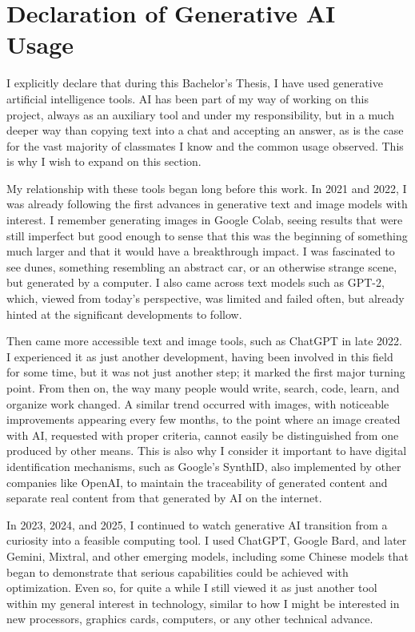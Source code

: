 \clearpage
{}
\section*{Declaration of Generative AI Usage}

I explicitly declare that during this Bachelor's Thesis, I have used generative artificial intelligence tools. AI has been part of my way of working on this project, always as an auxiliary tool and under my responsibility, but in a much deeper way than copying text into a chat and accepting an answer, as is the case for the vast majority of classmates I know and the common usage observed. This is why I wish to expand on this section.

My relationship with these tools began long before this work. In 2021 and 2022, I was already following the first advances in generative text and image models with interest. I remember generating images in Google Colab, seeing results that were still imperfect but good enough to sense that this was the beginning of something much larger and that it would have a breakthrough impact. I was fascinated to see dunes, something resembling an abstract car, or an otherwise strange scene, but generated by a computer. I also came across text models such as GPT-2, which, viewed from today's perspective, was limited and failed often, but already hinted at the significant developments to follow.

Then came more accessible text and image tools, such as ChatGPT in late 2022. I experienced it as just another development, having been involved in this field for some time, but it was not just another step; it marked the first major turning point. From then on, the way many people would write, search, code, learn, and organize work changed. A similar trend occurred with images, with noticeable improvements appearing every few months, to the point where an image created with AI, requested with proper criteria, cannot easily be distinguished from one produced by other means. This is also why I consider it important to have digital identification mechanisms, such as Google's SynthID, also implemented by other companies like OpenAI, to maintain the traceability of generated content and separate real content from that generated by AI on the internet.

In 2023, 2024, and 2025, I continued to watch generative AI transition from a curiosity into a feasible computing tool. I used ChatGPT, Google Bard, and later Gemini, Mixtral, and other emerging models, including some Chinese models that began to demonstrate that serious capabilities could be achieved with optimization. Even so, for quite a while I still viewed it as just another tool within my general interest in technology, similar to how I might be interested in new processors, graphics cards, computers, or any other technical advance.

